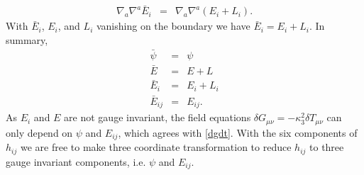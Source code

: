 \documentclass[10pt,letterpaper]{article}
\numberwithin{equation}{section}
\begin{document}
\begin{eqnarray}
\nabla_a\nabla^a \bar E_i &=& \nabla_a\nabla^a(E_i+L_i).
\end{eqnarray}
With $\bar E_i$, $E_i$, and $L_i$ vanishing on the boundary we have $\bar E_i = E_i + L_i$. In summary,
\begin{eqnarray}
\bar \psi &=& \psi
\nonumber\\
\bar E &=& E+L
\nonumber\\
\bar E_i &=& E_i + L_i
\nonumber\\
\bar E_{ij} &=& E_{ij}.
\end{eqnarray}
As $E_i$ and $E$ are not gauge invariant, the field equations $\delta G_{\mu\nu} = -\kappa^2_3 \delta T_{\mu\nu}$ can only depend on $\psi$ and $E_{ij}$, which agrees with \eqref{dgdt}. With the six components of $h_{ij}$ we are free to make three coordinate transformation to reduce $h_{ij}$ to three gauge invariant components, i.e. $\psi$ and $E_{ij}$. 

\end{document}
